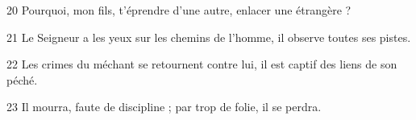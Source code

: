 
20 Pourquoi, mon fils, t’éprendre d’une autre, enlacer une étrangère ?

21 Le Seigneur a les yeux sur les chemins de l’homme, il observe toutes ses pistes.

22 Les crimes du méchant se retournent contre lui, il est captif des liens de son péché.

23 Il mourra, faute de discipline ; par trop de folie, il se perdra.